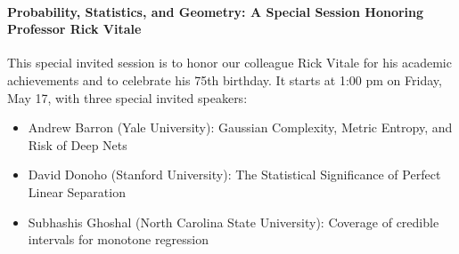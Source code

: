 \documentclass[12pt]{article}
\begin{document}
\paragraph{Probability, Statistics, and Geometry: A Special Session
  Honoring Professor Rick Vitale}
This special invited session is to honor our colleague Rick Vitale for
his academic achievements and to celebrate his 75th birthday.
It starts at 1:00 pm on Friday, May 17, with three special
invited speakers:
\begin{itemize}
\item
\textsf{Andrew Barron} (Yale University): Gaussian Complexity, Metric
Entropy, and Risk of Deep Nets
\item
\textsf{David Donoho}  (Stanford University): The Statistical
Significance of Perfect Linear Separation
\item
\textsf{Subhashis Ghoshal} (North Carolina State University): Coverage
of credible intervals for monotone regression
\end{itemize}
\end{document}
